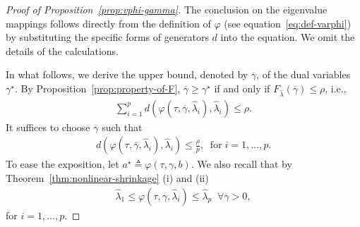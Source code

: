 \documentclass[11pt]{article}
\newcommand{\bgeqn}{\begin{eqnarray}}
\newcommand{\edeqn}{\end{eqnarray}}
\newcommand{\opt}{^\star}
\newcommand{\Let}{\triangleq}
\newcommand{\wh}{\widehat}
\begin{document}
\begin{proof}[Proof of Proposition~\ref{prop:vphi-gamma}]
The conclusion on the eigenvalue mappings follows directly from 
the definition of $\varphi$ (see equation~\eqref{eq:def-varphi}) by
    substituting the specific forms of generators $d$ into the equation.
    We omit the details of the calculations.

In what follows, we derive the upper bound,  denoted by $\overline{\gamma}$, of the dual variables $\gamma\opt$.
By Proposition~\ref{prop:property-of-F}, $\overline{\gamma}\geq \gamma\opt$ if and only if $F_{\wh\lambda}(\overline{\gamma})\leq  \rho$, i.e., 
    \bgeqn 
        \sum_{i=1}^p d(\varphi(\tau, \overline{\gamma}, \wh\lambda_i), \wh\lambda_i) \leq  \rho.
    \edeqn
    It suffices to choose $\overline{\gamma}$ such that 
    \begin{align}\label{ineq:d<=eps/p}
        d(\varphi(\tau, \overline{\gamma}, \wh\lambda_i), \wh\lambda_i) \leq \frac{ \rho}{p},\;\; \text{for}\;  i=1,...,p.
    \end{align}
    To ease the exposition, let
    $a\opt \Let \varphi(\tau,\gamma,b)$. We also recall that by Theorem~\ref{thm:nonlinear-shrinkage} (i) and (ii)
    \bgeqn 
    \wh\lambda_1\leq \varphi(\tau,\gamma,\wh\lambda_i)\leq \wh\lambda_p\;\; \forall \gamma>0, 
    \edeqn 
   for $i=1,...,p$. 


\end{proof}
\end{document}
